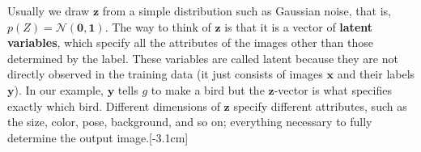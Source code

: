 Usually we draw $\mathbf{z}$ from a simple distribution such as Gaussian noise, that is, $p(Z) = \mathcal{N}(\mathbf{0},\mathbf{1})$. The way to think of $\mathbf{z}$ is that it is a vector of \textbf{latent variables}, which specify all the attributes of the images other than those determined by the label. These variables are called latent because they are not directly observed in the training data (it just consists of images $\mathbf{x}$ and their labels $\mathbf{y}$). %
In our example, $\mathbf{y}$ tells $g$ to make a bird but the $\mathbf{z}$-vector is what specifies exactly which bird. Different dimensions of $\mathbf{z}$ specify different attributes, such as the size, color, pose, background, and so on; everything necessary to fully determine the output image.[-3.1cm]%

